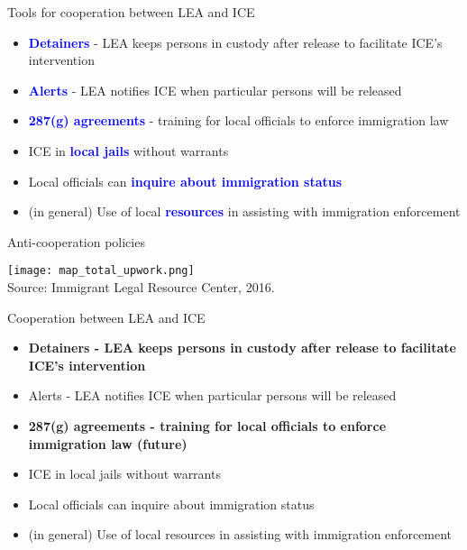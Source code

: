 \documentclass[xcolor=pdftex,dvipsnames,table]{beamer}
\begin{document}
\begin{frame}{Tools for cooperation between LEA and ICE}
\begin{itemize}
\item \textbf{\textcolor{Blue}{Detainers}} - LEA keeps persons in custody after release to facilitate ICE's intervention\vspace{0.10cm}
\item \textbf{\textcolor{Blue}{Alerts}} - LEA notifies ICE when particular persons will be released\vspace{0.10cm}
\item \textbf{\textcolor{Blue}{287(g) agreements}} - training for local officials to enforce immigration law\vspace{0.10cm}
\item ICE in \textbf{\textcolor{Blue}{local jails}} without warrants\vspace{0.10cm}
\item Local officials can \textbf{\textcolor{Blue}{inquire about immigration status}}\vspace{0.10cm}
\item (in general) Use of local \textbf{\textcolor{Blue}{resources}} in assisting with immigration enforcement\vspace{0.10cm}
\end{itemize}
\end{frame}

\begin{frame}{Anti-cooperation policies}
\begin{center}
\texttt{[image: map\_total\_upwork.png]}
\\\tiny{Source: Immigrant Legal Resource Center, 2016.}
\end{center}
\end{frame}

\begin{frame}{Cooperation between LEA and ICE}
\begin{itemize}
\item \textbf{Detainers - LEA keeps persons in custody after release to facilitate ICE's intervention}\vspace{0.10cm}
\item Alerts - LEA notifies ICE when particular persons will be released\vspace{0.10cm}
\item \textbf{287(g) agreements - training for local officials to enforce immigration law (future)}\vspace{0.10cm}
\item ICE in local jails without warrants\vspace{0.10cm}
\item Local officials can inquire about immigration status\vspace{0.10cm}
\item (in general)  Use of local resources in assisting with immigration enforcement
\end{itemize}
\end{frame}
\end{document}
